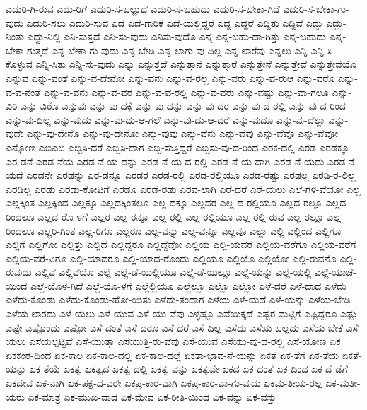 {ಎದುರಿ-ಗಿ-ರುವ
ಎದು-ರಿಗೆ
ಎದುರಿ-ಸ-ಬಲ್ಲುದೆ
ಎದುರಿ-ಸ-ಬಹುದು
ಎದುರಿ-ಸ-ಬೇಕಾ-ಗಿದೆ
ಎದುರಿ-ಸ-ಬೇಕಾ-ಗು-ವುದು
ಎದುರಿ-ಸಲು
ಎದುರಿ-ಸುವ
ಎದೆ
ಎದೆ-ಗಾರಿಕೆ
ಎದೆ-ಯಲ್ಲಿದ್ದರೆ
ಎದ್ದ
ಎದ್ದರೆ
ಎದ್ದಿತು
ಎದ್ದಿವೆ
ಎದ್ದು
ಎದ್ದು-ನಿಂತು
ಎದ್ದು-ನಿಲ್ಲಿ
ಎನಿ-ಸುತ್ತದೆ
ಎನಿ-ಸು-ವುದು
ಎನಿಸು-ವುದೊ
ಎನ್ನ
ಎನ್ನ-ಬಹು-ದಾ-ಗಿತ್ತು
ಎನ್ನ-ಬಹುದು
ಎನ್ನ-ಬೇಕಾ-ಗುತ್ತದೆ
ಎನ್ನ-ಬೇಕಾ-ಗು-ವುದು
ಎನ್ನ-ಬೇಡಿ
ಎನ್ನ-ಲಾಗು-ವು-ದಿಲ್ಲ
ಎನ್ನ-ಲಾರೆವು
ಎನ್ನಲು
ಎನ್ನಿ
ಎನ್ನಿ-ಸಿ-ಕೊಳ್ಳುವ
ಎನ್ನಿ-ಸಿತು
ಎನ್ನಿ-ಸು-ವುದು
ಎನ್ನು
ಎನ್ನುತ್ತದೆ
ಎನ್ನುತ್ತಾನೆ
ಎನ್ನುತ್ತಾರೆ
ಎನ್ನುತ್ತೇನೆ
ಎನ್ನುತ್ತೇವೆ
ಎನ್ನುತ್ತೇವೆಯೊ
ಎನ್ನುವ
ಎನ್ನು-ವಂತೆ
ಎನ್ನು-ವ-ದೇನೋ
ಎನ್ನು-ವನು
ಎನ್ನು-ವ-ರಲ್ಲ
ಎನ್ನು-ವರು
ಎನ್ನು-ವ-ರುಆ
ಎನ್ನು-ವರೊ
ಎನ್ನು-ವ-ವ-ನಂತೆ
ಎನ್ನು-ವ-ವನು
ಎನ್ನು-ವ-ವರ
ಎನ್ನು-ವ-ವ-ರಲ್ಲಿ
ಎನ್ನು-ವ-ವರು
ಎನ್ನು-ವಷ್ಟು
ಎನ್ನು-ವಾ-ಗಲೂ
ಎನ್ನು-ವಿರಿ
ಎನ್ನು-ವಿರೊ
ಎನ್ನುವು
ಎನ್ನು-ವು-ದಕ್ಕೆ
ಎನ್ನು-ವು-ದನ್ನು
ಎನ್ನು-ವು-ದರ
ಎನ್ನು-ವು-ದ-ರಲ್ಲಿ
ಎನ್ನು-ವು-ದ-ರಿಂದ
ಎನ್ನು-ವು-ದಿಲ್ಲ
ಎನ್ನು-ವುದು
ಎನ್ನು-ವು-ದು-ಆ-ಗಲೆ
ಎನ್ನು-ವು-ದು-ಆ-ದರೆ
ಎನ್ನು-ವುದೂ
ಎನ್ನು-ವು-ದೆಲ್ಲಾ
ಎನ್ನು-ವುದೇ
ಎನ್ನು-ವು-ದೇನೊ
ಎನ್ನು-ವು-ದೇನೋ
ಎನ್ನು-ವುವು
ಎನ್ನು-ವೆನು
ಎನ್ನು-ವೆವು
ಎನ್ನು-ವೆವೊ
ಎನ್ನು-ವೆವೋ
ಎನ್ನೋಣ
ಎಬಿಎಬಿ
ಎಬ್ಬಿಸಿ-ದರೆ
ಎಬ್ಬಿಸಿ-ದಾಗ
ಎಬ್ಬಿ-ಸುತ್ತಿದ್ದರೆ
ಎಬ್ಬಿಸು-ವು-ದ-ರಿಂದ
ಎರಕ-ದಲ್ಲಿ
ಎರಡ
ಎರಡಕ್ಕೂ
ಎರ-ಡನೆ
ಎರಡ-ನೆಯ
ಎರಡ-ನೆ-ಯ-ದನ್ನು
ಎರಡ-ನೆ-ಯ-ದ-ರಲ್ಲಿ
ಎರಡ-ನೆ-ಯ-ದಾಗಿ
ಎರಡ-ನೆ-ಯದು
ಎರಡ-ನೆ-ಯದೆ
ಎರಡನೇ
ಎರಡನ್ನು
ಎರ-ಡನ್ನೂ
ಎರಡರ
ಎರಡ-ರಲ್ಲಿ
ಎರಡ-ರಲ್ಲಿಯೂ
ಎರಡ-ರಷ್ಟು
ಎರಡಲ್ಲ
ಎರಡಿ-ರ-ಲಿಲ್ಲ
ಎರಡಿಲ್ಲ
ಎರಡು
ಎರಡು-ಕೋಟಿಗೆ
ಎರಡೂ
ಎರಡೆ-ರಡು
ಎರವ-ಲಾಗಿ
ಎರೆ-ದರೆ
ಎರೆ-ಯಲು
ಎಲೆ-ಗಳಿ-ವೆಯೋ
ಎಲ್ಲ
ಎಲ್ಲಕ್ಕಿಂತ
ಎಲ್ಲಕ್ಕಿಂದ
ಎಲ್ಲಕ್ಕೂ
ಎಲ್ಲದಕ್ಕಿಂತಲೂ
ಎಲ್ಲ-ದಕ್ಕೂ
ಎಲ್ಲದರ
ಎಲ್ಲ-ದ-ರಲ್ಲಿಯೂ
ಎಲ್ಲದ-ರಲ್ಲೂ
ಎಲ್ಲದ-ರಿಂದಲೂ
ಎಲ್ಲದ-ರೊ-ಳಗೆ
ಎಲ್ಲರ
ಎಲ್ಲ-ರನ್ನೂ
ಎಲ್ಲ-ರಲ್ಲಿ
ಎಲ್ಲ-ರಲ್ಲಿಯೂ
ಎಲ್ಲ-ರಲ್ಲಿ-ರುವ
ಎಲ್ಲ-ರಲ್ಲೂ
ಎಲ್ಲ-ರಿಂದಲೂ
ಎಲ್ಲರಿ-ಗಿಂತ
ಎಲ್ಲ-ರಿಗೂ
ಎಲ್ಲರೂ
ಎಲ್ಲ-ವನ್ನು
ಎಲ್ಲ-ವನ್ನೂ
ಎಲ್ಲವೂ
ಎಲ್ಲಾ
ಎಲ್ಲಿ
ಎಲ್ಲಿಂದ
ಎಲ್ಲಿಗೂ
ಎಲ್ಲಿಗೆ
ಎಲ್ಲಿಗೋ
ಎಲ್ಲಿತ್ತು
ಎಲ್ಲಿದೆ
ಎಲ್ಲಿದ್ದರೂ
ಎಲ್ಲಿದ್ದೆವೋ
ಎಲ್ಲಿಯ
ಎಲ್ಲಿ-ಯವರೆ
ಎಲ್ಲಿಯ-ವರೆಗೂ
ಎಲ್ಲಿಯ-ವರೆಗೆ
ಎಲ್ಲಿಯ-ವರೆ-ವಿಗೂ
ಎಲ್ಲಿ-ಯಾದರೂ
ಎಲ್ಲಿ-ಯಾದ-ರೊಂದು
ಎಲ್ಲಿಯೂ
ಎಲ್ಲಿಯೊ
ಎಲ್ಲಿಯೋ
ಎಲ್ಲಿ-ರುವನೊ
ಎಲ್ಲಿ-ರುವುದು
ಎಲ್ಲಿವೆ
ಎಲ್ಲಿವೆಯೊ
ಎಲ್ಲೆ
ಎಲ್ಲೆ-ಡೆ-ಯಲ್ಲಿಯೂ
ಎಲ್ಲೆ-ಡೆ-ಯಲ್ಲೂ
ಎಲ್ಲೆ-ಯನ್ನು
ಎಲ್ಲೆ-ಯಲ್ಲಿ
ಎಲ್ಲೆ-ಯಾಚೆ-ಯಿಂದ
ಎಲ್ಲೆ-ಯೊಳ-ಗಿದೆ
ಎಲ್ಲೆ-ಯೊ-ಳಗೆ
ಎಲ್ಲೆಲ್ಲಿಯೂ
ಎಲ್ಲೆಲ್ಲೂ
ಎಲ್ಲೊ
ಎಲ್ಲೋ
ಎಳೆ-ದರೆ
ಎಳೆ-ದಾದ
ಎಳೆದು
ಎಳೆದು-ಕೊಂಡು
ಎಳೆದು-ಕೊಂಡು-ಹೋ-ಯಿತು
ಎಳೆದು-ತಂದಾಗ
ಎಳೆಯ
ಎಳೆ-ಯದೆ
ಎಳೆ-ಯನ್ನು
ಎಳೆಯ-ಬೇಡಿ
ಎಳೆಯ-ಲಾರದು
ಎಳೆ-ಯಲು
ಎಳೆ-ಯುವ
ಎಳೆ-ಯು-ವೆವು
ಎಳ್ಳಷ್ಟೂ
ಎವೆಯಿಕ್ಕದೆ
ಎಷ್ಟರ-ಮಟ್ಟಿಗೆ
ಎಷ್ಟಿದ್ದರೂ
ಎಷ್ಟು
ಎಷ್ಟೇ
ಎಷ್ಟೊಂದು
ಎಷ್ಟೋ
ಎಸೆ-ದಂತೆ
ಎಸೆ-ದರೂ
ಎಸೆ-ದರೆ
ಎಸೆ-ದಿಲ್ಲ
ಎಸೆದು
ಎಸೆಯ-ಬಲ್ಲದು
ಎಸೆಯ-ಬೇಕೆ
ಎಸೆ-ಯಲು
ಎಸೆಯಲ್ಪಟ್ಟಿವೆ
ಎಸೆ-ಯುತ್ತಾ
ಎಸೆಯುತ್ತಿ-ರು-ವೆವು
ಎಸೆ-ಯುವ
ಎಸೆಯು-ವು-ದ-ರಲ್ಲಿ
ಎಸೆ-ಯೋಣ
ಏಕ
ಏಕಕಂಠ-ದಿಂದ
ಏಕ-ಕಾಲ
ಏಕ-ಕಾಲ-ದಲ್ಲಿ
ಏಕ-ಕಾಲ-ದಲ್ಲೆ
ಏಕತಾ-ಭಾವ-ನೆ-ಯನ್ನು
ಏಕತೆ
ಏಕ-ತೆಗೆ
ಏಕ-ತೆಯ
ಏಕತೆ-ಯನ್ನು
ಏಕ-ತೆಯೆ
ಏಕತ್ವ
ಏಕತ್ವದ
ಏಕತ್ವ-ದಲ್ಲಿ
ಏಕತ್ವ-ವನ್ನು
ಏಕತ್ವವೇ
ಏಕದ
ಏಕ-ದಂತೆ
ಏಕ-ದಿಂದ
ಏಕ-ದೆ-ಡೆಗೆ
ಏಕದೇವ
ಏಕ-ನಾಗಿ
ಏಕ-ಪಕ್ಷ-ದ-ವರೇ
ಏಕಪ್ರ-ಕಾರ-ವಾಗಿ
ಏಕಪ್ರ-ಕಾರ-ವಾ-ಗು-ವುದು
ಏಕಮ-ತೀಯ-ರಲ್ಲ
ಏಕ-ಮತೀ-ಯರು
ಏಕ-ಮಾತ್ರ
ಏಕ-ಮುಖ-ವಾದ
ಏಕ-ಮೇವ
ಏಕ-ರೀತಿ-ಯಿಂದ
ಏಕ-ವನ್ನು
ಏಕ-ವಸ್ತು
}
